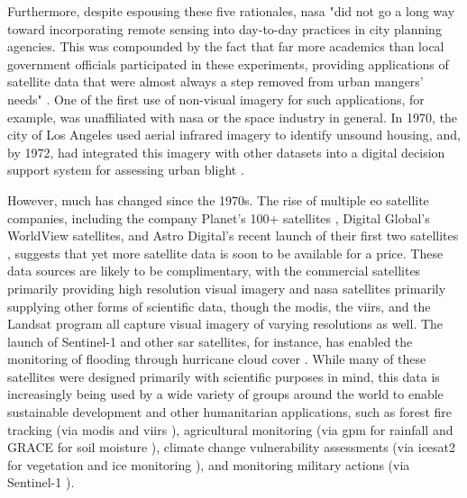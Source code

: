 Furthermore, despite espousing these five rationales, \ac{nasa} "did not go a long way toward incorporating remote sensing into day-to-day practices in city planning agencies. This was compounded by the fact that far more academics than local government officials participated in these experiments, providing applications of satellite data that were almost always a step removed from urban mangers' needs" \cite{lightWarfareWelfareDefense2005}. One of the first use of non-visual imagery for such applications, for example, was unaffiliated with \ac{nasa} or the space industry in general. In 1970, the city of Los Angeles used aerial infrared imagery to identify unsound housing, and, by 1972, had integrated this imagery with other datasets into a digital decision support system for assessing urban blight \cite{lightWarfareWelfareDefense2005}.

However, much has changed since the 1970s. The rise of multiple \ac{eo} satellite companies, including the company Planet's 100+ satellites \cite{tepperSatelliteMakerPlanet2015}, Digital Global's WorldView satellites, and Astro Digital’s recent launch of their first two satellites \cite{shieberAstroDigitalLaunched2017}, suggests that yet more satellite data is soon to be available for a price. These data sources are likely to be complimentary, with the commercial satellites primarily providing high resolution visual imagery and \ac{nasa} satellites primarily supplying other forms of scientific data, though the \ac{modis}, the \ac{viirs}, and the Landsat program all capture visual imagery of varying resolutions as well. The launch of Sentinel-1 and other \ac{sar} satellites, for instance, has enabled the monitoring of flooding through hurricane cloud cover \cite{zhangMappingExtentMagnitude2018}. While many of these satellites were designed primarily with scientific purposes in mind, this data is increasingly being used by a wide variety of groups around the world to enable sustainable development and other humanitarian applications, such as forest fire tracking (via \ac{modis} and \ac{viirs} \cite{schroederNewVIIRS375m2014}), agricultural monitoring (via \ac{gpm} for rainfall \cite{houGlobalPrecipitationMeasurement2014} and GRACE for soil moisture \cite{wahrTimevariableGravityGRACE2004}), climate change vulnerability assessments (via \ac{icesat2} for vegetation and ice monitoring \cite{mcgillMultipleAltimeterBeam2013}), and monitoring military actions (via Sentinel-1 \cite{sanchezSARSupportWar2022}).


